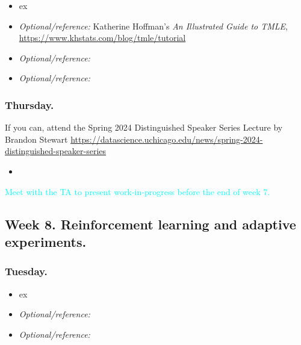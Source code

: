 \documentclass[letterpaper, 12pt, parskip=full,DIV=10]{scrartcl}
\begin{document}
\begin{itemize}
\item {}  ex
\item   \textit{Optional/reference:} Katherine Hoffman's \emph{An Illustrated Guide to TMLE}, \url{https://www.khstats.com/blog/tmle/tutorial}
\item  \textit{Optional/reference:}  
\item  \textit{Optional/reference:}  
\end{itemize}

\subsubsection*{Thursday.}

If you can, attend the Spring 2024 Distinguished Speaker Series Lecture by Brandon Stewart \url{https://datascience.uchicago.edu/news/spring-2024-distinguished-speaker-series}
\begin{itemize}
\item    {}
\end{itemize}


\textcolor{cyan}{Meet with the TA to present work-in-progress before the end of week 7.}

\subsection*{Week 8. Reinforcement learning and adaptive experiments.}

\subsubsection*{Tuesday.}
\begin{itemize}
\item {}  ex
\item  \textit{Optional/reference:}  
\item  \textit{Optional/reference:}  
\end{itemize}
\end{document}
